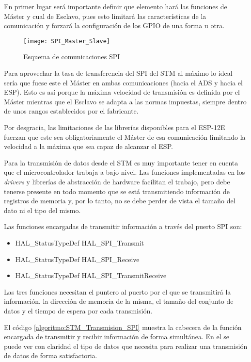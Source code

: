 En primer lugar será importante definir que elemento hará las funciones de Máster y cual de Esclavo, pues esto limitará las características de la comunicación y forzará la configuración de los \acrshort{GPIO} de una forma u otra.

\begin{figure} [h]
    \centering
    \texttt{[image: SPI\_Master\_Slave]}
    \caption{Esquema de comunicaciones SPI}
    \label{fig:SPI_Master_Slave}
\end{figure}

Para aprovechar la tasa de transferencia del SPI del STM al máximo lo ideal sería que fuese este el Máster en ambas comunicaciones (hacia el ADS y hacia el ESP). Esto es así porque la máxima velocidad de transmisión es definida por el Máster mientras que el Esclavo se adapta a las normas impuestas, siempre dentro de unos rangos establecidos por el fabricante.

Por desgracia, las limitaciones de las librerías disponibles para el ESP-12E fuerzan que este sea obligatoriamente el Máster de esa comunicación limitando la velocidad a la máxima que sea capaz de alcanzar el ESP.

Para la transmisión de datos desde el STM es muy importante tener en cuenta que el microcontrolador trabaja a bajo nivel. Las funciones implementadas en los \textit{drivers} y librerías de abstracción de hardware facilitan el trabajo, pero debe tenerse presente en todo momento que se está transmitiendo información de registros de memoria y, por lo tanto, no se debe perder de vista el tamaño del dato ni el tipo del mismo.

Las funciones encargadas de transmitir información a través del puerto \acrshort{SPI} son:
\begin{itemize}
\item HAL\_StatusTypeDef HAL\_SPI\_Transmit
\item HAL\_StatusTypeDef HAL\_SPI\_Receive
\item HAL\_StatusTypeDef HAL\_SPI\_TransmitReceive
\end{itemize}

Las tres funciones necesitan el puntero al puerto por el que se transmitirá la información, la dirección de memoria de la misma, el tamaño del conjunto de datos y el tiempo de espera por cada transmisión.

El código \ref{algoritmo:STM_Transmision_SPI} muestra la cabecera de la función encargada de transmitir y recibir información de forma simultánea. En el se puede ver con claridad el tipo de datos que necesita para realizar una transmisión de datos de forma satisfactoria.


